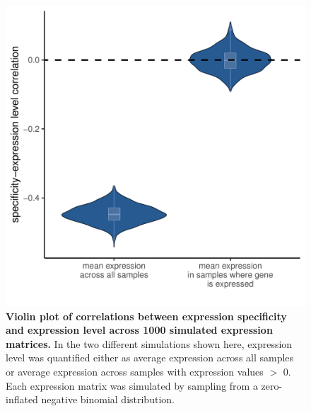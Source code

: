 \documentclass[12pt]{article}
\begin{document}
\begin{figure}[H]
\centering
\includegraphics[width = \linewidth]{figures/appendix_a/SimulationResults.pdf}
\caption{\textbf{Violin plot of correlations between expression specificity and expression level across 1000 simulated expression matrices.} In the two different simulations shown here, expression level was quantified either as average expression across all samples or average expression across samples with expression values $>$ 0. Each expression matrix was simulated by sampling from a zero-inflated negative binomial distribution.}%
\end{figure}

\newpage
\end{document}
